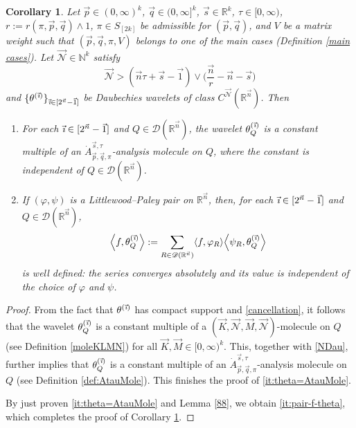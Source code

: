\documentclass[11pt, reqno]{amsart}
\newtheorem{corollary}[theorem]{Corollary}
\theoremstyle{definition}
\theoremstyle{remark}
\numberwithin{equation}{section}
\newcommand{\D}{\mathscr D}
\newcommand{\R}{\mathbb R}
\newcommand{\vone}{\vec 1}
\newcommand{\vi}{\vec{\textit{\i}}}
\newcommand{\vn}{\vec n}
\newcommand{\vp}{\vec p}
\newcommand{\vq}{\vec q}
\newcommand{\vs}{\vec s}
\begin{document}
\begin{corollary}\label{88 corollary}
Let $\vp\in(0,\infty)^k$, $\vq\in(0,\infty]^k$, $\vs\in\R^k$, $\tau\in[0,\infty)$,
$r:=r(\pi,\vp,\vq)\wedge 1$,
$\pi\in S_{[2k]}$ be admissible for $(\vp,\vq)$,
and $V$ be a matrix weight such that $(\vp,\vq,\pi,V)$ belongs
to one of the main cases (Definition \ref{main cases}).
Let $\vec{\mathscr N}\in\mathbb{N}^k$ satisfy
\begin{equation}\label{NDau}
\vec{\mathscr N}>(\vec n\tau+\vec s-\vone)\vee \Big(\frac{\vec n}r-\vec n-\vec s\Big)
\end{equation}
and
$\{\theta^{(\vi)}\}_{\vi\in[2^{\vn}-\vec1]}$
be Daubechies wavelets of class
$C^{\vec{\mathscr N}}(\mathbb R^{\vn})$. Then
\begin{enumerate}[\rm(i)]
\item\label{it:theta=AtauMole}
For each $\vi\in[2^{\vn}-\vec1]$ and $Q\in\D(\R^{\vn})$,
the wavelet $\theta^{(\vi)}_Q$ is a constant multiple of an
$\dot A^{\vec s,\tau}_{\vec p,\vec q,\pi}$-analysis molecule on $Q$,
where the constant is independent of $Q\in\D(\R^{\vn})$.

\item\label{it:pair-f-theta}
If $(\varphi,\psi)$ is a Littlewood--Paley pair on $\R^{\vn}$,
then, for each $\vi\in[2^{\vn}-\vec1]$ and $Q\in\mathscr{D}(\mathbb R^{\vec n})$,
$$
\Big\langle f,\theta^{(\vi)}_Q\Big\rangle
:=\sum_{R\in\D(\R^{\vn})}
\langle f,\varphi_R\rangle
\Big\langle\psi_R,\theta^{(\vi)}_Q\Big\rangle
$$
is well defined: the series converges absolutely
and its value is independent of the choice of $\varphi$ and $\psi$.
\end{enumerate}
\end{corollary}

\begin{proof}
From the fact that $\theta^{(\vi)}$ has compact support
and \eqref{cancellation},
it follows that the wavelet $\theta^{(\vi)}_Q$ is a constant multiple of a $(\vec K,\vec{\mathscr N},\vec M,\vec{\mathscr N})$-molecule on $Q$ (see Definition \ref{moleKLMN})
for all $\vec K,\vec M\in[0,\infty)^k$.
This, together with \eqref{NDau}, further implies that
$\theta^{(\vi)}_Q$ is a constant multiple of an $\dot A^{\vec s,\tau}_{\vec p,\vec q,\pi}$-analysis molecule on $Q$ (see Definition \ref{def:AtauMole}).
This finishes the proof of \eqref{it:theta=AtauMole}.

By just proven \eqref{it:theta=AtauMole} and Lemma \ref{88}, we obtain \eqref{it:pair-f-theta},
which completes the proof of Corollary \ref{88 corollary}.
\end{proof}
\end{document}

